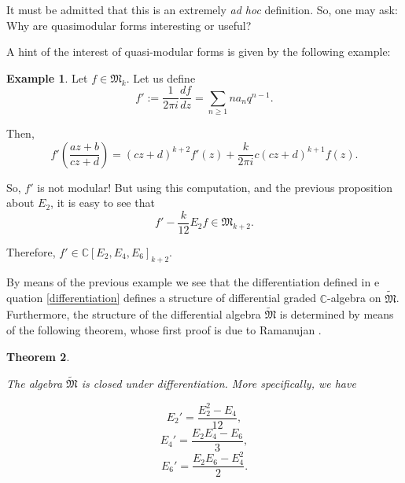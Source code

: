 \documentclass{article}
\numberwithin{equation}{section}
\numberwithin{figure}{section}
\theoremstyle{plain}
\newtheorem{theorem}{Theorem}[section]
\theoremstyle{definition}
\newtheorem{example}[theorem]{Example}
\numberwithin{equation}{section}
\newtheorem[S, bodystyle=\normalfont\noindent]{defiS}{Definition}[section]
\begin{document}
It must be admitted that this is an extremely \textit{ad hoc} definition. So, one may ask: Why are quasimodular forms interesting or useful?

A hint of the interest of quasi-modular forms is given by the following example:

\begin{example} Let $f\in\mathfrak{M}_k$. Let us define \begin{equation}\label{differentiation}f':=\frac{1}{2\pi i}\frac{df}{dz}=\sum_{n\geq 1}n a_n q^{n-1}.
\end{equation}
            
Then, $$f'(\frac{az+b}{cz+d})=(cz+d)^{k+2}f'(z)+\frac{k}{2\pi i}c(cz+d)^{k+1}f(z).$$
            
So, $f'$ is not modular! But using this computation, and the previous proposition about $E_2$, it is easy to see that $$f'-\frac{k}{12}E_2 f\in\mathfrak{M}_{k+2}.$$
            
Therefore, $f'\in\mathbb{C}[E_2,E_4,E_6]_{k+2}$.

\end{example}
By means of the previous example we see that the differentiation defined in e
quation \eqref{differentiation} defines a structure of differential graded $\mathbb{C}$-algebra on $\tilde{\mathfrak{M}}$. Furthermore, the structure of the differential algebra $\tilde{\mathfrak{M}}$ is determined by means of the following theorem, whose first proof is due to Ramanujan \parencite[Equation 30, page 181]{ramanujan}. 

\begin{theorem}\label{ramanujan}

    The algebra $\mathfrak{\tilde{M}}$ is closed under differentiation. More specifically, we have
    
    $$E_2'=\frac{E_2^2-E_4}{12},$$
    $$E_4'=\frac{E_2 E_4-E_6}{3},$$
    $$E_6'=\frac{E_2E_6-E_4^2}{2}.$$

\end{theorem}
\end{document}
